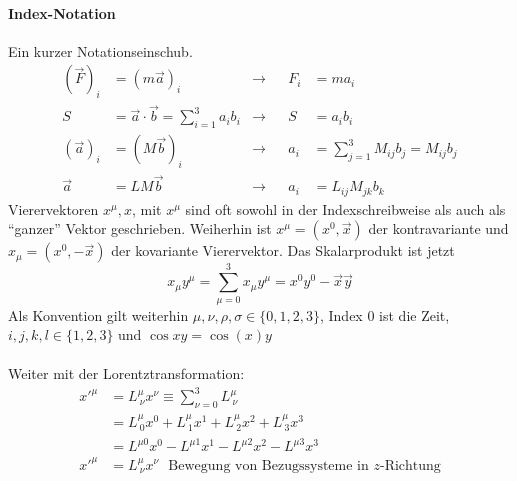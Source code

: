 \documentclass[oneside]{book}
\theoremstyle{definition}
\begin{document}
\paragraph{Index-Notation}
Ein kurzer Notationseinschub.
\begin{align*}
(\vec{F})_i &= (m \vec{a})_i &\rightarrow& & F_i &=ma_i\\
S &= \vec{a}\cdot\vec{b} = \sum_{i=1}^{3}a_i b_i  &\rightarrow& & S&=a_ib_i\\
(\vec{a})_i &= (M\vec{b})_i &\rightarrow& & a_i &= \sum_{j=1}^3 M_{ij} b_{j} = M_{ij}b_j\\
\vec{a} &= L M \vec{b}  &\rightarrow& & a_i &=L_{ij}M_{jk}b_k
\end{align*}
Vierervektoren $x^\mu, x$, mit $x^\mu$ sind oft sowohl in der Indexschreibweise als auch als "`ganzer"' Vektor geschrieben. Weiherhin ist $x^\mu = (x^0, \vec{x})$ der kontravariante und $x_\mu = (x^0, -\vec{x})$ der kovariante Vierervektor. Das Skalarprodukt ist jetzt
$$x_\mu y^\mu = \sum_{\mu=0}^{3} x_\mu y^\mu = x^0y^0 - \vec{x} \vec{y}$$
Als Konvention gilt weiterhin $\mu, \nu, \rho, \sigma \in  \{0, 1, 2, 3\}$, Index 0 ist die Zeit, $i,j,k,l \in \{1,2,3\}$ und $\cos x y = \cos(x) y$\\
\\
Weiter mit der Lorentztransformation:
\begin{align*}
x'^\mu &= L^\mu_{~\nu} x^\nu \equiv \sum_{\nu=0}^{3} L^\mu_{~\nu}\\
&= L^\mu_{~0} x^0 + L^\mu_{~1}x^1 + L^\mu_{~2}x^2 + L^\mu_{~3}x^3\\
&= L^{\mu 0}x^0 - L^{\mu 1}x^1 - L^{\mu 2}x^2 - L^{\mu 3}x^3\\
x'^\mu &= L^\mu_{~\nu} x^\nu \text{~~Bewegung von Bezugssysteme in $z$-Richtung}
\end{align*}
\end{document}
